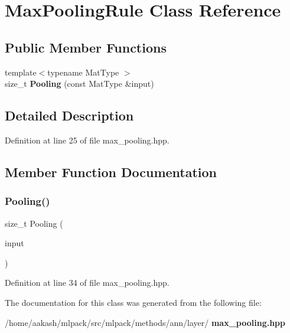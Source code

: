\section{Max\+Pooling\+Rule Class Reference}
\label{classmlpack_1_1ann_1_1MaxPoolingRule}
\subsection*{Public Member Functions}
\begin{DoxyCompactItemize}
\item 
{\footnotesize template$<$typename Mat\+Type $>$ }\\size\+\_\+t \textbf{ Pooling} (const Mat\+Type \&input)
\end{DoxyCompactItemize}


\subsection{Detailed Description}


Definition at line 25 of file max\+\_\+pooling.\+hpp.



\subsection{Member Function Documentation}
\mbox{\label{classmlpack_1_1ann_1_1MaxPoolingRule_a66fed9883adc75c15fb1aa532bcf9ce2}} 
\subsubsection{Pooling()}
{\footnotesize\ttfamily size\+\_\+t Pooling (\begin{DoxyParamCaption}\item[{const Mat\+Type \&}]{input }\end{DoxyParamCaption})\hspace{0.3cm}{\ttfamily [inline]}}



Definition at line 34 of file max\+\_\+pooling.\+hpp.



The documentation for this class was generated from the following file\+:\begin{DoxyCompactItemize}
\item 
/home/aakash/mlpack/src/mlpack/methods/ann/layer/\textbf{ max\+\_\+pooling.\+hpp}\end{DoxyCompactItemize}
